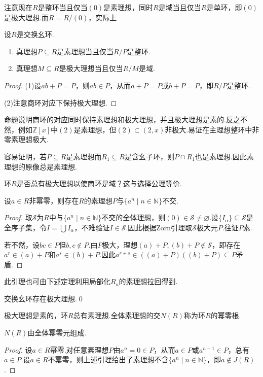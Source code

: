 注意现在$R$是整环当且仅当$(0)$是素理想，同时$R$是域当且仅当$R$是单环，即$(0)$是极大理想.而$R=R/(0)$，实际上
\begin{prop}
    设$R$是交换幺环.
    \begin{enumerate}
        \item 真理想$P\subseteq R$是素理想当且仅当$R/P$是整环.
        \item 真理想$M\subseteq R$是极大理想当且仅当$R/M$是域.
    \end{enumerate}
\end{prop}
\begin{proof}
    \hspace*{5.2pt}(1)设$ab+P=P$，则$ab\in P$，从而$a+P=P$或$b+P=P$，即$R/P$是整环.

    (2)注意商环对应下保持极大理想.
\end{proof}
\begin{remark}
    命题说明商环的对应同时保持素理想和极大理想，并且极大理想是素的.反之不然，例如$\mathbb{Z}[x]$中$(2)$是素理想，但$(2)\subset(2,x)$非极大.易证在主理想整环中非零素理想极大.

    容易证明，若$P\subseteq R$是素理想而$R_1\subseteq R$是含幺子环，则$P\cap R_1$也是素理想.因此素理想的原像总是素理想.
\end{remark}

环$R$是否总有极大理想以使商环是域？这与选择公理等价.
\begin{lemma*}
    设$a\in R$非幂零，则存在$R$的素理想$P$与$\{a^n\mid n\in\mathbb{N}\}$不交.
\end{lemma*}
\begin{proof}
    取$\mathcal{S}$为$R$中与$\{a^n\mid n\in\mathbb{N}\}$不交的全体理想，则$(0)\in\mathcal{S}\ne\varnothing$.设$\{I_\alpha\}\subseteq\mathcal{S}$是全序子集，令$I=\bigcup I_\alpha$，不难验证$I\in\mathcal{S}$.因此根据Zorn引理取$\mathcal{S}$极大元$P$.往证$P$素.

    若不然，设$bc\in P$但$b,c\notin P$.由$P$极大，理想$(a)+P,(b)+P\notin\mathcal{S}$，即存在$a^r\in (a)+P$和$a^s\in (b)+P$.因此$a^{r+s}\in((a)+P)((b)+P)\subseteq P$矛盾.
\end{proof}
\begin{remark}
    此引理也可由下述定理利用局部化$R_a$的素理想拉回得到.
\end{remark}
\begin{thm}
    交换幺环存在极大理想.\qed
\end{thm}

极大理想是素的，环$R$总有素理想.全体素理想的交$N(R)$称为环$R$的{\heiti 幂零根}.
\begin{prop}
    $N(R)$由全体幂零元组成.
\end{prop}
\begin{proof}
    设$a\in R$幂零.对任意素理想$P$由$a^n=0\in P$，从而$a\in P$或$a^{n-1}\in P$，总有$a\in P$.设$a\in R$不幂零，则上述引理给出了素理想不含$\{a^n\mid n\in\mathbb{N}\}$，即$a\notin J(R)$.
\end{proof}

